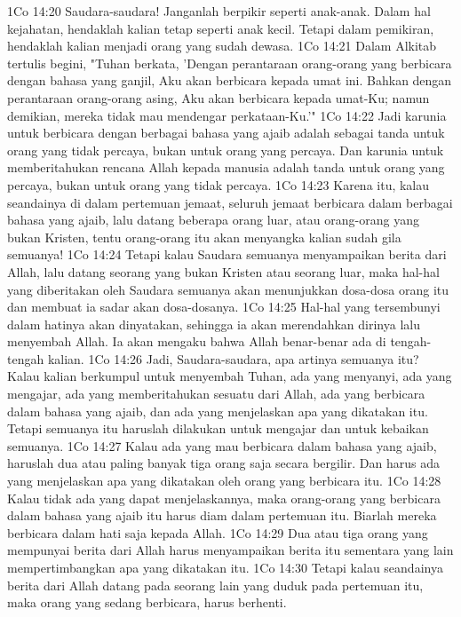1Co 14:20  Saudara-saudara! Janganlah berpikir seperti anak-anak. Dalam hal kejahatan, hendaklah kalian tetap seperti anak kecil. Tetapi dalam pemikiran, hendaklah kalian menjadi orang yang sudah dewasa.
1Co 14:21  Dalam Alkitab tertulis begini, "Tuhan berkata, 'Dengan perantaraan orang-orang yang berbicara dengan bahasa yang ganjil, Aku akan berbicara kepada umat ini. Bahkan dengan perantaraan orang-orang asing, Aku akan berbicara kepada umat-Ku; namun demikian, mereka tidak mau mendengar perkataan-Ku.'"
1Co 14:22  Jadi karunia untuk berbicara dengan berbagai bahasa yang ajaib adalah sebagai tanda untuk orang yang tidak percaya, bukan untuk orang yang percaya. Dan karunia untuk memberitahukan rencana Allah kepada manusia adalah tanda untuk orang yang percaya, bukan untuk orang yang tidak percaya.
1Co 14:23  Karena itu, kalau seandainya di dalam pertemuan jemaat, seluruh jemaat berbicara dalam berbagai bahasa yang ajaib, lalu datang beberapa orang luar, atau orang-orang yang bukan Kristen, tentu orang-orang itu akan menyangka kalian sudah gila semuanya!
1Co 14:24  Tetapi kalau Saudara semuanya menyampaikan berita dari Allah, lalu datang seorang yang bukan Kristen atau seorang luar, maka hal-hal yang diberitakan oleh Saudara semuanya akan menunjukkan dosa-dosa orang itu dan membuat ia sadar akan dosa-dosanya.
1Co 14:25  Hal-hal yang tersembunyi dalam hatinya akan dinyatakan, sehingga ia akan merendahkan dirinya lalu menyembah Allah. Ia akan mengaku bahwa Allah benar-benar ada di tengah-tengah kalian.
1Co 14:26  Jadi, Saudara-saudara, apa artinya semuanya itu? Kalau kalian berkumpul untuk menyembah Tuhan, ada yang menyanyi, ada yang mengajar, ada yang memberitahukan sesuatu dari Allah, ada yang berbicara dalam bahasa yang ajaib, dan ada yang menjelaskan apa yang dikatakan itu. Tetapi semuanya itu haruslah dilakukan untuk mengajar dan untuk kebaikan semuanya.
1Co 14:27  Kalau ada yang mau berbicara dalam bahasa yang ajaib, haruslah dua atau paling banyak tiga orang saja secara bergilir. Dan harus ada yang menjelaskan apa yang dikatakan oleh orang yang berbicara itu.
1Co 14:28  Kalau tidak ada yang dapat menjelaskannya, maka orang-orang yang berbicara dalam bahasa yang ajaib itu harus diam dalam pertemuan itu. Biarlah mereka berbicara dalam hati saja kepada Allah.
1Co 14:29  Dua atau tiga orang yang mempunyai berita dari Allah harus menyampaikan berita itu sementara yang lain mempertimbangkan apa yang dikatakan itu.
1Co 14:30  Tetapi kalau seandainya berita dari Allah datang pada seorang lain yang duduk pada pertemuan itu, maka orang yang sedang berbicara, harus berhenti.
